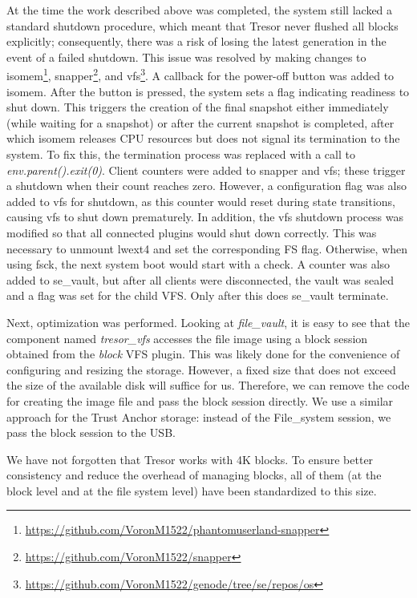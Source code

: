 At the time the work described above was completed, the system still lacked a standard shutdown procedure, which meant that Tresor never flushed all blocks explicitly; consequently, there was a risk of losing the latest generation in the event of a failed shutdown. This issue was resolved by making changes to isomem\footnote{\url{https://github.com/VoronM1522/phantomuserland-snapper}}, snapper\footnote{\url{https://github.com/VoronM1522/snapper}}, and vfs\footnote{\url{https://github.com/VoronM1522/genode/tree/se/repos/os}}. A callback for the power-off button was added to isomem. After the button is pressed, the system sets a flag indicating readiness to shut down. This triggers the creation of the final snapshot either immediately (while waiting for a snapshot) or after the current snapshot is completed, after which isomem releases CPU resources but does not signal its termination to the system. To fix this, the termination process was replaced with a call to \textit{env.parent().exit(0)}. Client counters were added to snapper and vfs; these trigger a shutdown when their count reaches zero. However, a configuration flag was also added to vfs for shutdown, as this counter would reset during state transitions, causing vfs to shut down prematurely. In addition, the vfs shutdown process was modified so that all connected plugins would shut down correctly. This was necessary to unmount lwext4 and set the corresponding FS flag. Otherwise, when using fsck, the next system boot would start with a check. A counter was also added to se\_vault, but after all clients were disconnected, the vault was sealed and a flag was set for the child VFS. Only after this does se\_vault terminate.

Next, optimization was performed. Looking at \textit{file\_vault}, it is easy to see that the component named \textit{tresor\_vfs} accesses the file image using a block session obtained from the \textit{block} VFS plugin. This was likely done for the convenience of configuring and resizing the storage. However, a fixed size that does not exceed the size of the available disk will suffice for us. Therefore, we can remove the code for creating the image file and pass the block session directly. We use a similar approach for the Trust Anchor storage: instead of the File\_system session, we pass the block session to the USB.

We have not forgotten that Tresor works with 4K blocks. To ensure better consistency and reduce the overhead of managing blocks, all of them (at the block level and at the file system level) have been standardized to this size.

